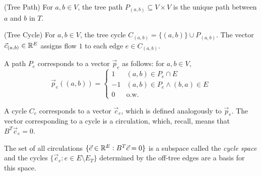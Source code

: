 \begin{definition}(Tree Path)
    For $a,b \in V$, the tree path $P_{(a,b)} \subseteq V \times V$ is the unique path between $a$ and $b$ in $T$.
\end{definition}
\begin{definition}(Tree Cycle)
    For $a,b \in V$, the tree cycle $C_{(a,b)} = \{(a,b)\} \cup P_{(a,b)}$. The vector $\vec c_{(a,b)} \in \mathbb R^E$ assigns flow $1$ to each edge $e \in C_{(a,b)}$. 
\end{definition}

\noindent A path $P_e$ corresponds to a vector $\vec p_e$ as follows: for $a,b \in V$, $$\vec p_{e}((a,b)) = \begin{cases} 1 & (a,b) \in P_{e} \cap E \\ -1 & (a,b)  \in P_{e} \land (b,a) \in E  \\ 0 & \text{o.w.} \end{cases}$$

A cycle $C_e$ corresponds to a  vector $\vec c_e$, which is defined analogously to $\vec p_e$. The vector corresponding to a cycle is a circulation, which, recall, means that $B^T \vec c_e = 0$. 


The set of all circulations $\{ \vec c \in \mathbb R^E : B^T\vec c = 0\}$ is a subspace called the \textit{cycle space} and the cycles $\{ \vec c_e : e \in E \setminus E_T \}$  determined by the off-tree edges are a basis for this space. 

